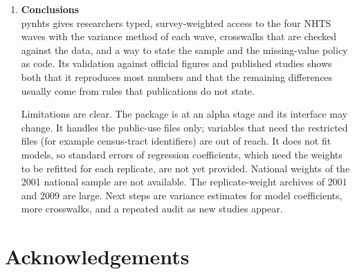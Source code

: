 \documentclass[preprint,12pt, a4paper]{elsarticle}
\begin{document}
\begin{enumerate}
Design-correct uncertainty for every wave, guarded comparisons across waves, and sample-flow tables make it cheaper to ask questions that depend on trends and on subpopulations, and to report them so that others can repeat them. The study module is meant to change the daily practice of analysts by making the sample rules and the missing-value policy part of the code. We have not measured any change in practice yet.

\textbf{Extent of use}\\[2pt]

The first version was released on PyPI in October 2026 and the package has had 13 releases in total; version 0.8.1 is archived on Zenodo \cite{software}. The package has no known external users, no publication has used it, and it has no commercial use. PyPI records downloads, but they include automated mirrors, so we do not report them as users. The evidence of impact is therefore the validation and the audit, which can be repeated by anyone with the public files, and the intended use is by researchers who analyse the NHTS and by those who review such analyses.

\item \textbf{Conclusions}\label{sec:conclusions}\\

pynhts gives researchers typed, survey-weighted access to the four NHTS waves with the variance method of each wave, crosswalks that are checked against the data, and a way to state the sample and the missing-value policy as code. Its validation against official figures and published studies shows both that it reproduces most numbers and that the remaining differences usually come from rules that publications do not state.

Limitations are clear. The package is at an alpha stage and its interface may change. It handles the public-use files only; variables that need the restricted files (for example census-tract identifiers) are out of reach. It does not fit models, so standard errors of regression coefficients, which need the weights to be refitted for each replicate, are not yet provided. National weights of the 2001 national sample are not available. The replicate-weight archives of 2001 and 2009 are large. Next steps are variance estimates for model coefficients, more crosswalks, and a repeated audit as new studies appear.

\end{enumerate}

\section*{Acknowledgements}
\end{document}
